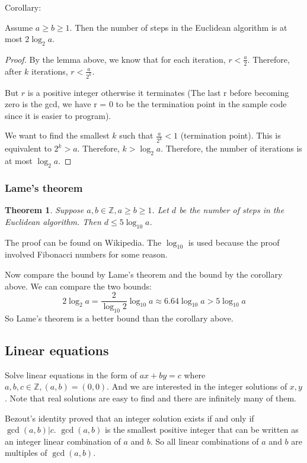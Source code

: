 \documentclass[letterpaper,12pt,oneside]{article}
\newtheorem{theorem}{Theorem}
\begin{document}
Corollary:

Assume $a \ge b \ge 1$. Then the number of steps in the Euclidean algorithm is
at most $2 \log_2 a$. \begin{proof}
    By the lemma above, we know that for each iteration, $r < \frac{a}{2}$. Therefore, after $k$ iterations, $r < \frac{a}{2^k}$.

    But $r$ is a positive integer otherwise it terminates (The last r before
    becoming zero is the gcd, we have r = 0 to be the termination point in the
    sample code since it is easier to program).

    We want to find the smallest $k$ such that $\frac{a}{2^k} < 1$ (termination
    point). This is equivalent to $2^k > a$. Therefore, $k > \log_2 a$. Therefore,
    the number of iterations is at most $\log_2 a$.
\end{proof}

\subsubsection{Lame's theorem}
\begin{theorem}
    Suppose $a, b \in \mathbb{Z}, a \ge b \ge 1$. Let $d$ be the number of steps in the Euclidean algorithm. Then $d \leq 5 \log_{10} a$.
\end{theorem}

The proof can be found on Wikipedia. The $\log_{10}$ is used because the proof
involved Fibonacci numbers for some reason.

Now compare the bound by Lame's theorem and the bound by the corollary above.
We can compare the two bounds:\[
    2 \log_2 a = \frac{2}{\log_{10} 2} \log_{10} a \approx 6.64 \log_{10} a > 5 \log_{10} a
\]
So Lame's theorem is a better bound than the corollary above.

\subsection{Linear equations}
Solve linear equations in the form of $ax + by = c$ where $a, b, c \in
    \mathbb{Z}, (a, b)=(0, 0)$. And we are interested in the integer solutions of
$x, y$. Note that real solutions are easy to find and there are infinitely many
of them.

Bezout's identity proved that an integer solution exists if and only if
$\gcd(a, b) | c$. $\gcd(a, b)$ is the smallest positive integer that can be
written as an integer linear combination of $a$ and $b$. So all linear
combinations of $a$ and $b$ are multiples of $\gcd(a, b)$.
\end{document}
